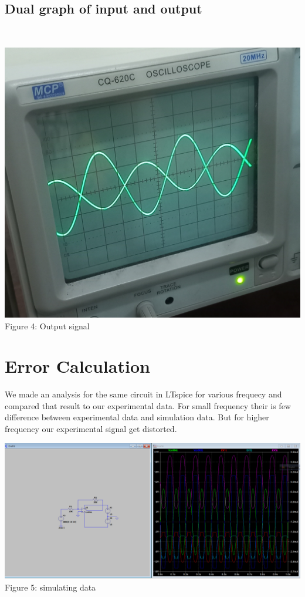 \documentclass[12pt]{article}
\begin{document}
\subsection{Dual graph of input and output}\\
[1cm]
\begin{center}
    \includegraphics[scale=.09]{20220831_104510.jpg}\\
    \caption{Figure 4: Output signal}
\end{center}
\section{Error Calculation}
We made an analysis for the same circuit in LTspice for various frequecy and compared that result to our experimental data. For small frequency their is few difference between experimental data and simulation data. But for higher frequency our experimental signal get distorted.\\
\pagebreak
\begin{center}
    \includegraphics[scale=.4]{Screenshot 2022-09-03 191155.png}\\
    \caption{Figure 5: simulating data}
\end{center}
\end{document}
